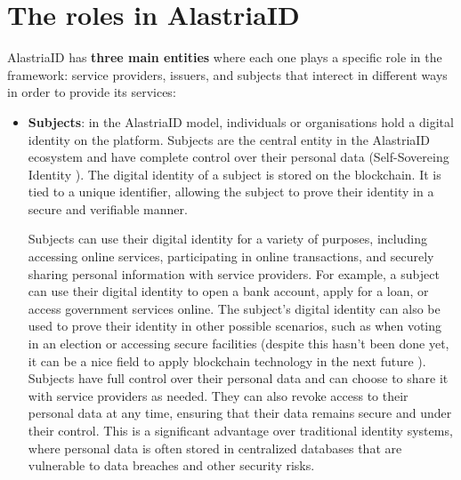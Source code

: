 \documentclass[target=mst,aauheader=]{thud}
\begin{document}
\section{The roles in AlastriaID}

AlastriaID has \textbf{three main entities} where each one plays a specific role in the framework: service providers, issuers, and subjects that interect in different ways in order to provide its services:

\begin{itemize}

    \item \textbf{Subjects}: in the AlastriaID model, individuals or organisations hold a digital identity on the platform. Subjects are the central entity in the AlastriaID ecosystem and have complete control over their personal data (Self-Sovereing Identity \cite{selfSovereignIdentity}). The digital identity of a subject is stored on the blockchain. It is tied to a unique identifier, allowing the subject to prove their identity in a secure and verifiable manner.

        Subjects can use their digital identity for a variety of purposes, including accessing online services, participating in online transactions, and securely sharing personal information with service providers. For example, a subject can use their digital identity to open a bank account, apply for a loan, or access government services online. The subject's digital identity can also be used to prove their identity in other possible scenarios, such as when voting in an election or accessing secure facilities (despite this hasn't been done yet, it can be a nice field to apply blockchain technology in the next future \cite{blockchainVotingSystem}).
        Subjects have full control over their personal data and can choose to share it with service providers as needed. They can also revoke access to their personal data at any time, ensuring that their data remains secure and under their control. This is a significant advantage over traditional identity systems, where personal data is often stored in centralized databases that are vulnerable to data breaches and other security risks.


\end{itemize}
\end{document}
